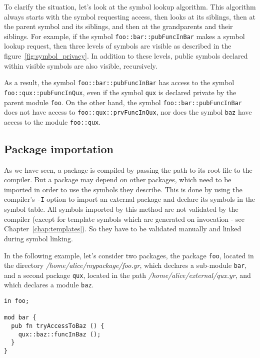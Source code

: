 To clarify the situation, let's look at the symbol lookup algorithm. This
algorithm always starts with the symbol requesting access, then looks at its
siblings, then at the parent symbol and its siblings, and then at the
grandparents and their siblings. For example, if the symbol
\texttt{foo::bar::pubFuncInBar} makes a symbol lookup request, then three levels
of symbols are visible as described in the figure~\ref{fig:symbol_privacy}. In
addition to these levels, public symbols declared within visible symbols are
also visible, recursively.



As a result, the symbol \texttt{foo::bar::pubFuncInBar} has access to the symbol
\texttt{foo::qux::pubFuncInQux}, even if the symbol \texttt{qux} is declared
private by the parent module \texttt{foo}. On the other hand, the symbol
\texttt{foo::bar::pubFuncInBar} does not have access to
\texttt{foo::qux::prvFuncInQux}, nor does the symbol \texttt{baz} have access to
the module \texttt{foo::qux}.

\subsection{Package importation}

As we have seen, a package is compiled by passing the path to its root file to
the compiler. But a package may depend on other packages, which need to be
imported in order to use the symbols they describe. This is done by using the
compiler's \texttt{-I} option to import an external package and declare its
symbols in the symbol table. All symbols imported by this method are not
validated by the compiler (except for template symbols which are generated on
invocation - see Chapter~\ref{chap:templates}). So they have to be validated
manually and linked during symbol linking.

In the following example, let's consider two packages, the package \texttt{foo},
located in the directory \textit{/home/alice/mypackage/foo.yr}, which declares a
sub-module \texttt{bar}, and a second package \texttt{qux}, located in the path
\textit{/home/alice/external/qux.yr}, and which declares a module \texttt{baz}.

\begin{lstlisting}[caption=\textit{/home/alice/mypackage/foo.yr}, style=coloredverbatim]
in foo;

mod bar {
  pub fn tryAccessToBaz () {
    qux::baz::funcInBaz ();
  }
}
\end{lstlisting}

